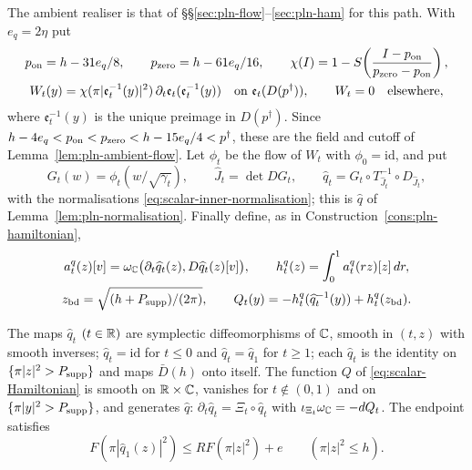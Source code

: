 The ambient realiser is that of \S\S\ref{sec:pln-flow}--\ref{sec:pln-ham} for this path. With $e_q=2\eta$ put
\begin{gather}\label{eq:scalar-source-cutoff}
 p_{\rm on}=h-31e_q/8,\qquad p_{\rm zero}=h-61e_q/16,\qquad
 \chi(I)=1-S\!\left(\frac{I-p_{\rm on}}{p_{\rm zero}-p_{\rm on}}\right),\\
 W_t(y)=\chi(\pi|\mathfrak e_t^{-1}(y)|^2)\,
             \partial_t\mathfrak e_t(\mathfrak e_t^{-1}(y))
 \quad\text{on }\mathfrak e_t(D(p^\dagger)),\qquad W_t=0\quad\text{elsewhere},\notag
\end{gather}
where $\mathfrak e_t^{-1}(y)$ is the unique preimage in $D(p^\dagger)$. Since
$h-4e_q<p_{\rm on}<p_{\rm zero}<h-15e_q/4<p^\dagger$, these are the field and cutoff of Lemma~\ref{lem:pln-ambient-flow}.
Let $\phi_t$ be the flow of $W_t$ with $\phi_0=\mathrm{id}$, and put
\begin{equation}\label{eq:scalar-qhat}
 G_t(w)=\phi_t(w/\sqrt{\gamma_t}),\qquad \widehat J_t=\det DG_t,\qquad
 \widehat q_t=G_t\circ T_{\widehat J_t}^{-1}\circ D_{\widehat J_t},
\end{equation}
with the normalisations \eqref{eq:scalar-inner-normalisation}; this is $\hat q$ of Lemma~\ref{lem:pln-normalisation}.
Finally define, as in Construction~\ref{cons:pln-hamiltonian},
\begin{gather}\label{eq:scalar-Hamiltonian}
 a^q_t(z)[v]=\omega_{\mathbb{C}}\bigl(\partial_t\widehat q_t(z),D\widehat q_t(z)[v]\bigr),\qquad
 h^q_t(z)=\int_0^1a^q_t(rz)[z]\,dr,\\
 z_{\rm bd}=\sqrt{(h+P_{\rm supp})/(2\pi)},\qquad
 Q_t(y)=-h^q_t(\widehat q_t^{-1}(y))+h^q_t(z_{\rm bd}).\notag
\end{gather}

\begin{proposition}\label{prop:scalar-planar-realisation}
The maps $\widehat q_t$ $(t\in\mathbb{R})$ are symplectic diffeomorphisms of $\mathbb{C}$, smooth in $(t,z)$ with smooth inverses;
$\widehat q_t=\mathrm{id}$ for $t\le0$ and $\widehat q_t=\widehat q_1$ for $t\ge1$; each $\widehat q_t$ is the identity on
$\{\pi|z|^2>P_{\rm supp}\}$ and maps $\bar D(h)$ onto itself. The function $Q$ of \eqref{eq:scalar-Hamiltonian} is smooth
on $\mathbb{R}\times\mathbb{C}$, vanishes for $t\notin(0,1)$ and on $\{\pi|y|^2>P_{\rm supp}\}$, and generates $\widehat q$:
$\partial_t\widehat q_t=\Xi_t\circ\widehat q_t$ with $\iota_{\Xi_t}\omega_{\mathbb{C}}=-dQ_t$. The endpoint satisfies
\begin{equation}\label{eq:scalar-full-comparison}
 F(\pi|\widehat q_1(z)|^2)\le RF(\pi|z|^2)+e\qquad(\pi|z|^2\le h).
\end{equation}
{\normalfont {}}
\end{proposition}

